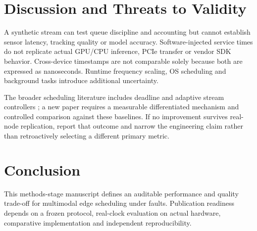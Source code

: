 \section{Discussion and Threats to Validity}
A synthetic stream can test queue discipline and accounting but cannot establish sensor latency, tracking quality or model accuracy. Software-injected service times do not replicate actual GPU/CPU inference, PCIe transfer or vendor SDK behavior. Cross-device timestamps are not comparable solely because both are expressed as nanoseconds. Runtime frequency scaling, OS scheduling and background tasks introduce additional uncertainty.

The broader scheduling literature includes deadline and adaptive stream controllers \cite{nigade2024,sedlak2025,dynamicbatch2024}; a new paper requires a measurable differentiated mechanism and controlled comparison against these baselines. If no improvement survives real-node replication, report that outcome and narrow the engineering claim rather than retroactively selecting a different primary metric.

\section{Conclusion}
This methods-stage manuscript defines an auditable performance and quality trade-off for multimodal edge scheduling under faults. Publication readiness depends on a frozen protocol, real-clock evaluation on actual hardware, comparative implementation and independent reproducibility.
